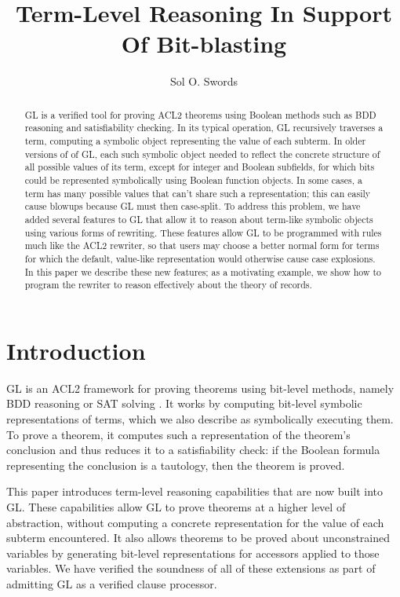 \documentclass[submission,copyright,creativecommons]{eptcs}
\title{Term-Level Reasoning In Support Of Bit-blasting}
\author{Sol O. Swords
\institute{Centaur Techology, Inc.\\
Austin, TX, USA}
\email{sswords@centtech.com}
}
\begin{document}
\maketitle

\begin{abstract}

  GL is a verified tool for proving ACL2 theorems using Boolean
  methods such as BDD reasoning and satisfiability checking.  In its
  typical operation, GL recursively traverses a term, computing a
  symbolic object representing the value of each subterm.  In older
  versions of of GL, each such symbolic object needed to reflect the
  concrete structure of all possible values of its term, except for
  integer and Boolean subfields, for which bits could be represented
  symbolically using Boolean function objects.  In some cases, a term
  has many possible values that can't share such a
  representation; this can easily cause blowups because GL must then
  case-split.  To address this problem, we have added several features
  to GL that allow it to reason about term-like symbolic objects using
  various forms of rewriting.  These features allow GL to be
  programmed with rules much like the ACL2 rewriter, so that users may
  choose a better normal form for terms for which the default,
  value-like representation would otherwise cause case explosions.  In
  this paper we describe these new features; as a motivating example,
  we show how to program the rewriter to reason effectively about the
  theory of records.

\end{abstract}

\section{Introduction}
\label{sec:intro}

GL is an ACL2 framework for proving theorems using bit-level methods,
namely BDD reasoning or SAT solving \cite{bit-blasting-GL, gl-diss}.
It works by computing bit-level symbolic representations of terms,
which we also describe as symbolically executing them.  To prove a
theorem, it computes such a representation of the theorem's conclusion
and thus reduces it to a satisfiability check: if the Boolean formula
representing the conclusion is a tautology, then the theorem is
proved.

This paper introduces term-level reasoning capabilities that are now
built into GL.  These capabilities allow GL to prove theorems at a
higher level of abstraction, without computing a concrete
representation for the value of each subterm encountered.  It also
allows theorems to be proved about unconstrained variables by
generating bit-level representations for accessors applied to those
variables.  We have verified the soundness of all of these extensions
as part of admitting GL as a verified clause processor.
\end{document}
